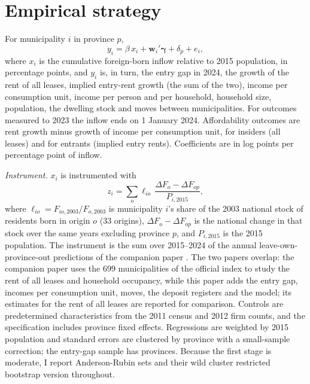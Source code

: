 \documentclass[11pt,a4paper]{article}
\begin{document}
\section{Empirical strategy}\label{sec:strategy}

For municipality $i$ in province $p$,
\begin{equation}\label{eq:est}
y_i=\beta\, x_i+\bm{w}_i'\bm\gamma+\delta_p+e_i,
\end{equation}
where $x_i$ is the cumulative foreign-born inflow relative to 2015 population, in percentage points, and $y_i$ is, in turn, the entry gap in 2024, the growth of the rent of all leases, implied entry-rent growth (the sum of the two), income per consumption unit, income per person and per household, household size, population, the dwelling stock and moves between municipalities. For outcomes measured to 2023 the inflow ends on 1 January 2024. Affordability outcomes are rent growth minus growth of income per consumption unit, for insiders (all leases) and for entrants (implied entry rents). Coefficients are in log points per percentage point of inflow.

\textit{Instrument.} $x_i$ is instrumented with
\begin{equation}\label{eq:z}
z_i=\sum_o \ell_{io}\,\frac{\Delta F_{o}-\Delta F_{op}}{P_{i,2015}},
\end{equation}
where $\ell_{io}=F_{io,2003}/F_{o,2003}$ is municipality $i$'s share of the 2003 national stock of residents born in origin $o$ (33 origins), $\Delta F_o-\Delta F_{op}$ is the national change in that stock over the same years excluding province $p$, and $P_{i,2015}$ is the 2015 population. The instrument is the sum over 2015--2024 of the annual leave-own-province-out predictions of the companion paper \citep{fernandez2026}. The two papers overlap: the companion paper uses the 699 municipalities of the official index to study the rent of all leases and household occupancy, while this paper adds the entry gap, incomes per consumption unit, moves, the deposit registers and the model; its estimates for the rent of all leases are reported for comparison. Controls are predetermined characteristics from the 2011 census and 2012 firm counts, and the specification includes province fixed effects. Regressions are weighted by 2015 population and standard errors are clustered by province with a small-sample correction; the entry-gap sample has \nProv{} provinces. Because the first stage is moderate, I report Anderson-Rubin sets and their wild cluster restricted bootstrap version throughout.
\end{document}
